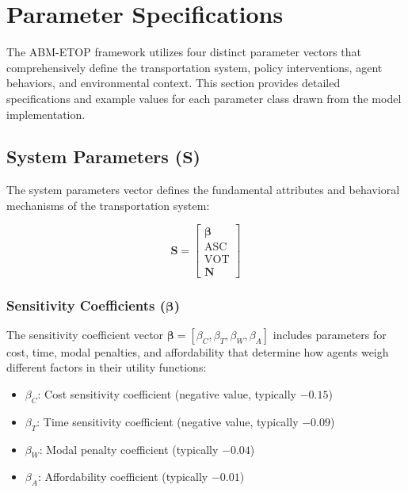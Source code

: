 \section{Parameter Specifications}
\label{app:param_specs}

The ABM-ETOP framework utilizes four distinct parameter vectors that comprehensively define the transportation system, policy interventions, agent behaviors, and environmental context. This section provides detailed specifications and example values for each parameter class drawn from the model implementation.

\subsection{System Parameters \texorpdfstring{($\mathbf{S}$)}{(S)}}
The system parameters vector defines the fundamental attributes and behavioral mechanisms of the transportation system:

\begin{equation}
\mathbf{S} = \begin{bmatrix} \boldsymbol{\beta} \\ \text{ASC} \\ \text{VOT} \\ \mathbf{N} \end{bmatrix}
\end{equation}

\subsubsection{Sensitivity Coefficients (\texorpdfstring{$\boldsymbol{\beta}$}{β})}
The sensitivity coefficient vector $\boldsymbol{\beta} = [\beta_C, \beta_T, \beta_W, \beta_A]$ includes parameters for cost, time, modal penalties, and affordability that determine how agents weigh different factors in their utility functions:

\begin{itemize}
    \item $\beta_C$: Cost sensitivity coefficient (negative value, typically $-0.15$)
    \item $\beta_T$: Time sensitivity coefficient (negative value, typically $-0.09$)
    \item $\beta_W$: Modal penalty coefficient (typically $-0.04$)
    \item $\beta_A$: Affordability coefficient (typically $-0.01$)
\end{itemize}

